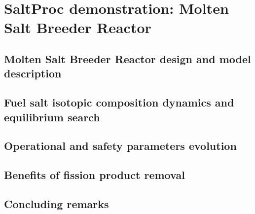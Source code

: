 \chapter[Tool demonstration: Molten Salt Breeder Reactor]{SaltProc 
demonstration: Molten Salt Breeder Reactor}

\section{Molten Salt Breeder Reactor design and model description}

\section{Fuel salt isotopic composition dynamics and equilibrium search}

\section{Operational and safety parameters evolution}

\section{Benefits of fission product removal}

\section{Concluding remarks}